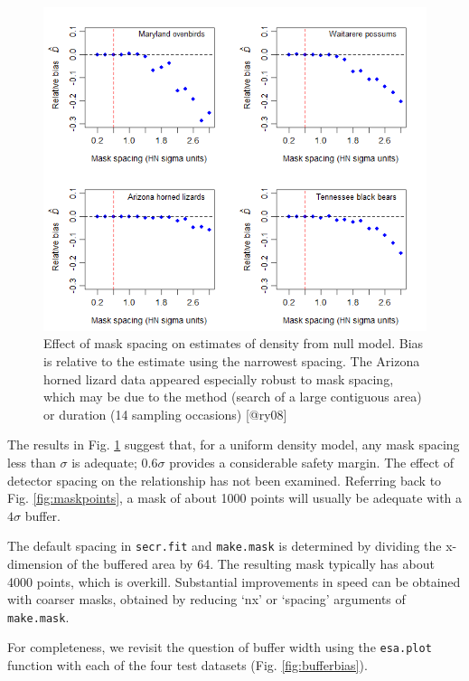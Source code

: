 \documentclass[
]{book}
\begin{document}
\begin{figure}
\includegraphics[width=0.9\linewidth]{figures/maskspacing} \caption{Effect of mask spacing on estimates of density from null model. Bias is relative to the estimate using the narrowest spacing. The Arizona horned lizard data appeared especially robust to mask spacing, which may be due to the method (search of a large contiguous area) or duration (14 sampling occasions) [@ry08]}\label{fig:maskspacing}
\end{figure}

The results in Fig. \ref{fig:maskspacing} suggest that, for a uniform density model, any mask spacing less than \(\sigma\) is adequate; \(0.6\sigma\) provides a considerable safety margin. The effect of detector spacing on the relationship has not been examined. Referring back to Fig. \ref{fig:maskpoints}, a mask of about 1000 points will usually be adequate with a \(4\sigma\) buffer.

The default spacing in \texttt{secr.fit} and \texttt{make.mask} is determined by dividing the x-dimension of the buffered area by 64. The resulting mask typically has about 4000 points, which is overkill. Substantial improvements in speed can be obtained with coarser masks, obtained by reducing `nx' or `spacing' arguments of \texttt{make.mask}.

For completeness, we revisit the question of buffer width using the \texttt{esa.plot} function with each of the four test datasets (Fig. \ref{fig:bufferbias}).
\end{document}
